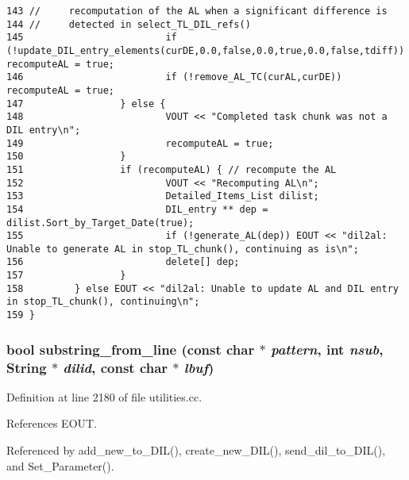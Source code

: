 \begin{verbatim}
143 //     recomputation of the AL when a significant difference is
144 //     detected in select_TL_DIL_refs()
145                         if (!update_DIL_entry_elements(curDE,0.0,false,0.0,true,0.0,false,tdiff)) recomputeAL = true;
146                         if (!remove_AL_TC(curAL,curDE)) recomputeAL = true;
147                 } else {
148                         VOUT << "Completed task chunk was not a DIL entry\n";
149                         recomputeAL = true;
150                 }
151                 if (recomputeAL) { // recompute the AL
152                         VOUT << "Recomputing AL\n";
153                         Detailed_Items_List dilist;
154                         DIL_entry ** dep = dilist.Sort_by_Target_Date(true);
155                         if (!generate_AL(dep)) EOUT << "dil2al: Unable to generate AL in stop_TL_chunk(), continuing as is\n";
156                         delete[] dep;
157                 }
158         } else EOUT << "dil2al: Unable to update AL and DIL entry in stop_TL_chunk(), continuing\n";
159 }
\end{verbatim}\normalsize 
{}
\subsubsection{\setlength{\rightskip}{0pt plus 5cm}bool substring\_\-from\_\-line (const char $\ast$ {\em pattern}, int {\em nsub}, {\bf String} $\ast$ {\em dilid}, const char $\ast$ {\em lbuf})}\label{dil2al_8hh_a244}




Definition at line 2180 of file utilities.cc.

References EOUT.

Referenced by add\_\-new\_\-to\_\-DIL(), create\_\-new\_\-DIL(), send\_\-dil\_\-to\_\-DIL(), and Set\_\-Parameter().



